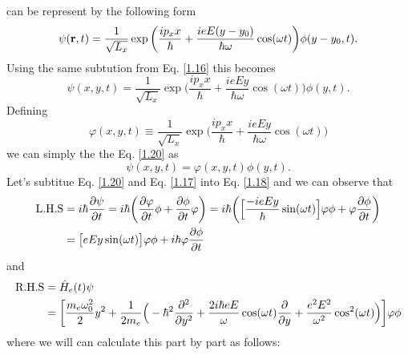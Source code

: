 \documentclass[a4paper]{article}
\numberwithin{equation}{subsection}
\numberwithin{equation}{section}
\begin{document}
can be represent by the following form
\begin{equation} \label{1.19}
    \psi(\vb{r},t) = \frac{1}{\sqrt{L_x}} \exp\bigg(
      \frac{ip_x x}{\hbar} +
      \frac{ieE(y-y_0)}{\hbar \omega}\cos(\omega t)
    \bigg) \phi(y-y_0,t).
\end{equation}
Using the same subtution from Eq. \eqref{1.16} this becomes
\begin{equation} \label{1.20}
    \psi(x,y,t) = \frac{1}{\sqrt{L_x}} \exp\bigg(
      \frac{ip_x x}{\hbar} +
      \frac{ieEy}{\hbar \omega}\cos(\omega t)
    \bigg) \phi(y,t).
\end{equation}
Defining
\begin{equation} \label{1.21}
    \varphi(x,y,t) \equiv \frac{1}{\sqrt{L_x}} \exp\bigg(
      \frac{ip_x x}{\hbar} +
      \frac{ieEy}{\hbar \omega}\cos(\omega t)
    \bigg)
\end{equation}
we can simply the the Eq. \eqref{1.20} as
\begin{equation} \label{1.22}
    \psi(x,y,t) = \varphi(x,y,t) \phi(y,t).
\end{equation}
Let's subtitue Eq. \eqref{1.20} and Eq. \eqref{1.17} into Eq. \eqref{1.18} and we can observe that
\begin{equation} \label{1.23}
  \begin{aligned}
    \text{L.H.S} & = i \hbar \pdv{\psi}{t} =
    i \hbar \bigg( \pdv{\varphi}{t} \phi + \pdv{\phi}{t} \varphi \bigg) =
    i \hbar \bigg(
      \Big[\frac{-ieEy}{\hbar}\sin(\omega t)\Big]\varphi\phi +
      \varphi  \pdv{\phi}{t}
    \bigg) \\
    & =
    \big[{eEy}\sin(\omega t)\big]\varphi\phi +
    i \hbar\varphi  \pdv{\phi}{t}
  \end{aligned}
\end{equation}
and
\begin{equation} \label{1.24}
  \begin{aligned}
    \text{R.H.S} & = \hat{H}_e(t)\psi \\
    & =
    \bigg[
    \frac{m_e \omega_0^2}{2}y^2 +
    \frac{1}{2m_e}\Big(
    -\hbar^2 \pdv[2]{y} +
    \frac{2i\hbar eE}{\omega}\cos(\omega t) \pdv{y}+
    \frac{e^2E^2}{\omega^2}\cos[2](\omega t)
    \Big) \bigg]
    \varphi\phi
  \end{aligned}
\end{equation}
where we will can calculate this part by part as follows:
\end{document}
